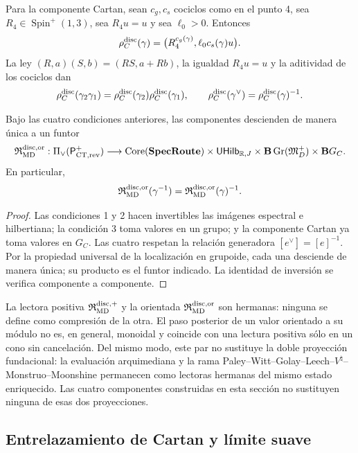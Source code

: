 Para la componente Cartan, sean \(c_g,c_s\) cociclos como en el punto 4,
sea \(R_4\in\operatorname{Spin}^{+}(1,3)\), sea \(R_4u=u\) y sea
\(\ell_0>0\). Entonces
\[
 \rho_C^{\rm disc}(\gamma)
 =\bigl(R_4^{c_g(\gamma)},\ell_0c_s(\gamma)u\bigr).
\]
La ley
\((R,a)(S,b)=(RS,a+Rb)\), la igualdad \(R_4u=u\) y la aditividad de los
cociclos dan
\[
 \rho_C^{\rm disc}(\gamma_2\gamma_1)
 =\rho_C^{\rm disc}(\gamma_2)\rho_C^{\rm disc}(\gamma_1),
 \qquad
 \rho_C^{\rm disc}(\gamma^\vee)
 =\rho_C^{\rm disc}(\gamma)^{-1}.
\]

\begin{theorem}
\label{thm:int68-realizacion-orientada}
Bajo las cuatro condiciones anteriores, las componentes descienden de manera
única a un funtor
\[
 \mathfrak R_{\rm MD}^{\rm disc,or}:
 \Pi_\vee(\mathsf P_{{\rm CT},{\rm rev}}^+)
 \longrightarrow
 \operatorname{Core}(\mathbf{SpecRoute})
 \times\mathsf{UHilb}_{\mathbb R,J}
 \times\mathbf B\operatorname{Gr}(\mathfrak M_D^+)
 \times\mathbf BG_C.
\]
En particular,
\[
 \mathfrak R_{\rm MD}^{\rm disc,or}(\gamma^{-1})
 =\mathfrak R_{\rm MD}^{\rm disc,or}(\gamma)^{-1}.
\]
\end{theorem}

\begin{proof}
Las condiciones 1 y 2 hacen invertibles las imágenes espectral e
hilbertiana; la condición 3 toma valores en un grupo; y la componente Cartan
ya toma valores en \(G_C\). Las cuatro respetan la relación generadora
\([e^\vee]=[e]^{-1}\). Por la propiedad universal de la localización en
grupoide, cada una desciende de manera única; su producto es el funtor
indicado. La identidad de inversión se verifica componente a componente.
\end{proof}

La lectora positiva \(\mathfrak R_{\rm MD}^{\rm disc,+}\) y la orientada
\(\mathfrak R_{\rm MD}^{\rm disc,or}\) son hermanas: ninguna se define como
compresión de la otra. El paso posterior de un valor orientado a su módulo no
es, en general, monoidal y coincide con una lectura positiva sólo en un cono
sin cancelación. Del mismo modo, este par no sustituye la doble proyección
fundacional: la evaluación arquimediana y la rama
Paley--Witt--Golay--Leech--\(V^\natural\)--Monstruo--Moonshine permanecen
como lectoras hermanas del mismo estado enriquecido. Las cuatro componentes
construidas en esta sección no sustituyen ninguna de esas dos proyecciones.

\subsection{Entrelazamiento de Cartan y límite suave}

